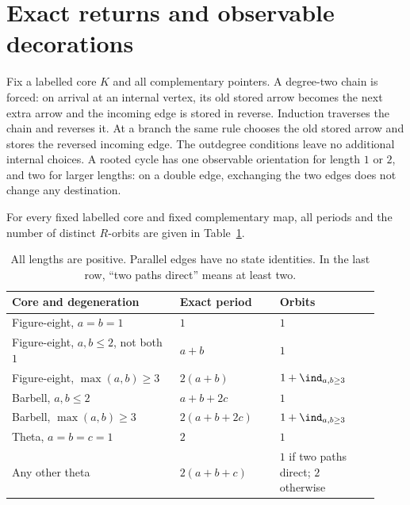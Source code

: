 \section{Exact returns and observable decorations}
Fix a labelled core $K$ and all complementary pointers. A degree-two chain
is forced: on arrival at an internal vertex, its old stored arrow becomes
the next extra arrow and the incoming edge is stored in reverse. Induction
traverses the chain and reverses it. At a branch the same rule chooses the
old stored arrow and stores the reversed incoming edge. The outdegree
conditions leave no additional internal choices. A rooted cycle has one
observable orientation for length $1$ or $2$, and two for larger lengths:
on a double edge, exchanging the two edges does not change any destination.

\begin{theorem}\label{thm:table}
For every fixed labelled core and fixed complementary map, all periods and
the number of distinct $R$-orbits are given in Table~\ref{tab:periods}.
\end{theorem}
\begin{table}[t]
\centering
\begin{tabular}{@{}p{0.42\linewidth}p{0.25\linewidth}p{0.25\linewidth}@{}}
\hline
Core and degeneration & Exact period & Orbits\\
\hline
Figure-eight, $a=b=1$ & $1$ & $1$\\
Figure-eight, $a,b\le2$, not both $1$ & $a+b$ & $1$\\
Figure-eight, $\max(a,b)\ge3$ & $2(a+b)$ & $1+\ind_{a,b\ge3}$\\
Barbell, $a,b\le2$ & $a+b+2c$ & $1$\\
Barbell, $\max(a,b)\ge3$ & $2(a+b+2c)$ & $1+\ind_{a,b\ge3}$\\
Theta, $a=b=c=1$ & $2$ & $1$\\
Any other theta & $2(a+b+c)$ & $1$ if two paths direct; $2$ otherwise\\
\hline
\end{tabular}
\caption{All lengths are positive. Parallel edges have no state identities.
In the last row, ``two paths direct'' means at least two.}
\label{tab:periods}
\end{table}
